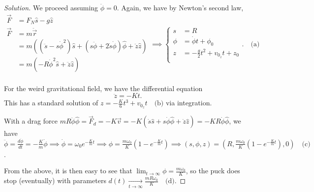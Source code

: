 \documentclass{article}
\begin{document}
\begin{proof}[Solution]
We proceed assuming $\ddot{\phi} = 0$. Again, we have by Newton's second
law,
\[ \begin{aligned}
\vec{F} &= F_N \hat{s} - g \hat{z} \\
\vec{F} &= m \ddot{\vec{r}} \\
&= m \left(\left( \ddot{s} - s \dot{\phi}^2 \right) \hat{s} + \left(s
\ddot{\phi} + 2 \dot{s} \dot{\phi}\right) \hat{\phi} + \ddot{z}
\hat{z}\right) \\
&= m\left(-R \dot{\phi}^2 \hat{s} + \ddot{z} \hat{z}\right) \\
\end{aligned} \implies \boxed{\left \lbrace \begin{aligned}
s &= R \\
\phi &= \dot{\phi} t + \phi_0 \\
z &= -\frac{g}{2} t^2 + v_{0_z} t + z_0 \\
\end{aligned} \right.}. \quad \textrm{(a)} \]

For the weird gravitational field, we have the differential equation
\[ \ddot{z} = -Kt. \]
This has a standard solution of $\boxed{z = -\frac{K}{6} t^3 + v_{0_z}
t} \quad \textrm{(b)}$ via integration.

With a drag force $m R \ddot{\phi} \hat{\phi} = \vec{F}_d = -K \vec{v} =
-K (\dot{s} \hat{s} + s \dot{\phi} \hat{\phi} + \dot{z} \hat{z}) = -KR
\dot{\phi}\hat{\phi}$, we have $\ddot{\phi} = \frac{d \dot{\phi}}{dt} =
-\frac{K}{m} \dot{\phi} \implies \dot{\phi} = \omega_0 e^{-\frac{K}{m}
t} \implies \phi = \frac{m \omega_0}{K} \left(1 - e^{-\frac{K}{m}
t}\right) \implies \boxed{(s, \phi, z) = \left(R, \frac{m
\omega_0}{K}\left(1 - e^{-\frac{K}{m} t}\right), 0\right)} \quad
\textrm{(c)}$.

From the above, it is then easy to see that $\lim_{t \to \infty} \phi =
\frac{m \omega_0}{K}$, so the puck does stop (eventually) with
parameters $\boxed{d(t) \xrightarrow[t \to \infty]{} \frac{m R
\omega_0}{K}} \quad \textrm{(d)}$.
\end{proof}
\end{document}
